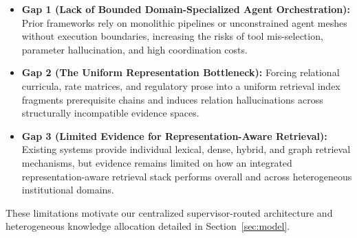 \begin{itemize}
    \setlength{\itemsep}{1.5pt}
    \setlength{\parsep}{0pt}
    \item \textbf{Gap 1 (Lack of Bounded Domain-Specialized Agent Orchestration):} Prior frameworks rely on monolithic pipelines or unconstrained agent meshes without execution boundaries, increasing the risks of tool mis-selection, parameter hallucination, and high coordination costs.
    \item \textbf{Gap 2 (The Uniform Representation Bottleneck):} Forcing relational curricula, rate matrices, and regulatory prose into a uniform retrieval index fragments prerequisite chains and induces relation hallucinations across structurally incompatible evidence spaces.
    \item \textbf{Gap 3 (Limited Evidence for Representation-Aware Retrieval):} Existing systems provide individual lexical, dense, hybrid, and graph retrieval mechanisms, but evidence remains limited on how an integrated representation-aware retrieval stack performs overall and across heterogeneous institutional domains.
\end{itemize}

These limitations motivate our centralized supervisor-routed architecture and heterogeneous knowledge allocation detailed in Section~\ref{sec:model}.
